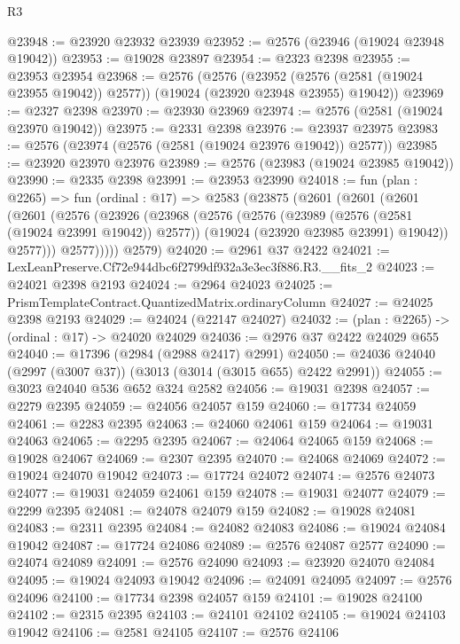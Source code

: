 \begin{lexlean}{R3}
\begin{coremodule}
@23948 := @23920 @23932 @23939
@23952 := @2576 (@23946 (@19024 @23948 @19042))
@23953 := @19028 @23897
@23954 := @2323 @2398
@23955 := @23953 @23954
@23968 := @2576
    (@2576
      (@23952 (@2576 (@2581 (@19024 @23955 @19042)) @2577))
      (@19024 (@23920 @23948 @23955) @19042))
@23969 := @2327 @2398
@23970 := @23930 @23969
@23974 := @2576 (@2581 (@19024 @23970 @19042))
@23975 := @2331 @2398
@23976 := @23937 @23975
@23983 := @2576 (@23974 (@2576 (@2581 (@19024 @23976 @19042)) @2577))
@23985 := @23920 @23970 @23976
@23989 := @2576 (@23983 (@19024 @23985 @19042))
@23990 := @2335 @2398
@23991 := @23953 @23990
@24018 := fun (plan : @2265) =>
  fun (ordinal : @17) =>
  @2583
    (@23875
      (@2601
        (@2601
          (@2601
            (@2601
              (@2576
                (@23926
                  (@23968
                    (@2576
                      (@2576
                        (@23989 (@2576 (@2581 (@19024 @23991 @19042)) @2577))
                        (@19024 (@23920 @23985 @23991) @19042))
                      @2577)))
                @2577)))))
      @2579)
@24020 := @2961 @37 @2422
@24021 := LexLeanPreserve.Cf72e944dbc6f2799df932a3e3ec3f886.R3.__fits_2
@24023 := @24021 @2398 @2193
@24024 := @2964 @24023
@24025 := PrismTemplateContract.QuantizedMatrix.ordinaryColumn
@24027 := @24025 @2398 @2193
@24029 := @24024 (@22147 @24027)
@24032 := (plan : @2265) -> (ordinal : @17) -> @24020 @24029
@24036 := @2976 @37 @2422 @24029 @655
@24040 := @17396 (@2984 (@2988 @2417) @2991)
@24050 := @24036 @24040 (@2997 (@3007 @37)) (@3013 (@3014 (@3015 @655) @2422 @2991))
@24055 := @3023 @24040 @536 @652 @324 @2582
@24056 := @19031 @2398
@24057 := @2279 @2395
@24059 := @24056 @24057 @159
@24060 := @17734 @24059
@24061 := @2283 @2395
@24063 := @24060 @24061 @159
@24064 := @19031 @24063
@24065 := @2295 @2395
@24067 := @24064 @24065 @159
@24068 := @19028 @24067
@24069 := @2307 @2395
@24070 := @24068 @24069
@24072 := @19024 @24070 @19042
@24073 := @17724 @24072
@24074 := @2576 @24073
@24077 := @19031 @24059 @24061 @159
@24078 := @19031 @24077
@24079 := @2299 @2395
@24081 := @24078 @24079 @159
@24082 := @19028 @24081
@24083 := @2311 @2395
@24084 := @24082 @24083
@24086 := @19024 @24084 @19042
@24087 := @17724 @24086
@24089 := @2576 @24087 @2577
@24090 := @24074 @24089
@24091 := @2576 @24090
@24093 := @23920 @24070 @24084
@24095 := @19024 @24093 @19042
@24096 := @24091 @24095
@24097 := @2576 @24096
@24100 := @17734 @2398 @24057 @159
@24101 := @19028 @24100
@24102 := @2315 @2395
@24103 := @24101 @24102
@24105 := @19024 @24103 @19042
@24106 := @2581 @24105
@24107 := @2576 @24106

\end{coremodule}
\end{lexlean}
